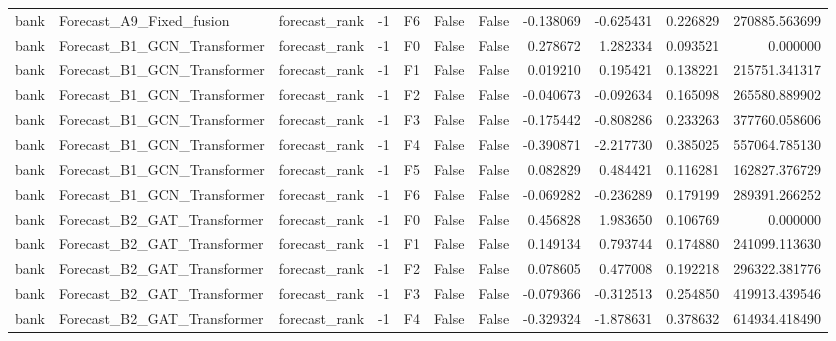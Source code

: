 \begin{tabular}{lllrlllrrrr}
      bank &     Forecast\_A9\_Fixed\_fusion & forecast\_rank &    -1 &  F6 &           False &            False & -0.138069 & -0.625431 & 0.226829 &    270885.563699 \\
      bank &  Forecast\_B1\_GCN\_Transformer & forecast\_rank &    -1 &  F0 &           False &            False &  0.278672 &  1.282334 & 0.093521 &         0.000000 \\
      bank &  Forecast\_B1\_GCN\_Transformer & forecast\_rank &    -1 &  F1 &           False &            False &  0.019210 &  0.195421 & 0.138221 &    215751.341317 \\
      bank &  Forecast\_B1\_GCN\_Transformer & forecast\_rank &    -1 &  F2 &           False &            False & -0.040673 & -0.092634 & 0.165098 &    265580.889902 \\
      bank &  Forecast\_B1\_GCN\_Transformer & forecast\_rank &    -1 &  F3 &           False &            False & -0.175442 & -0.808286 & 0.233263 &    377760.058606 \\
      bank &  Forecast\_B1\_GCN\_Transformer & forecast\_rank &    -1 &  F4 &           False &            False & -0.390871 & -2.217730 & 0.385025 &    557064.785130 \\
      bank &  Forecast\_B1\_GCN\_Transformer & forecast\_rank &    -1 &  F5 &           False &            False &  0.082829 &  0.484421 & 0.116281 &    162827.376729 \\
      bank &  Forecast\_B1\_GCN\_Transformer & forecast\_rank &    -1 &  F6 &           False &            False & -0.069282 & -0.236289 & 0.179199 &    289391.266252 \\
      bank &  Forecast\_B2\_GAT\_Transformer & forecast\_rank &    -1 &  F0 &           False &            False &  0.456828 &  1.983650 & 0.106769 &         0.000000 \\
      bank &  Forecast\_B2\_GAT\_Transformer & forecast\_rank &    -1 &  F1 &           False &            False &  0.149134 &  0.793744 & 0.174880 &    241099.113630 \\
      bank &  Forecast\_B2\_GAT\_Transformer & forecast\_rank &    -1 &  F2 &           False &            False &  0.078605 &  0.477008 & 0.192218 &    296322.381776 \\
      bank &  Forecast\_B2\_GAT\_Transformer & forecast\_rank &    -1 &  F3 &           False &            False & -0.079366 & -0.312513 & 0.254850 &    419913.439546 \\
      bank &  Forecast\_B2\_GAT\_Transformer & forecast\_rank &    -1 &  F4 &           False &            False & -0.329324 & -1.878631 & 0.378632 &    614934.418490 \\

\end{tabular}
